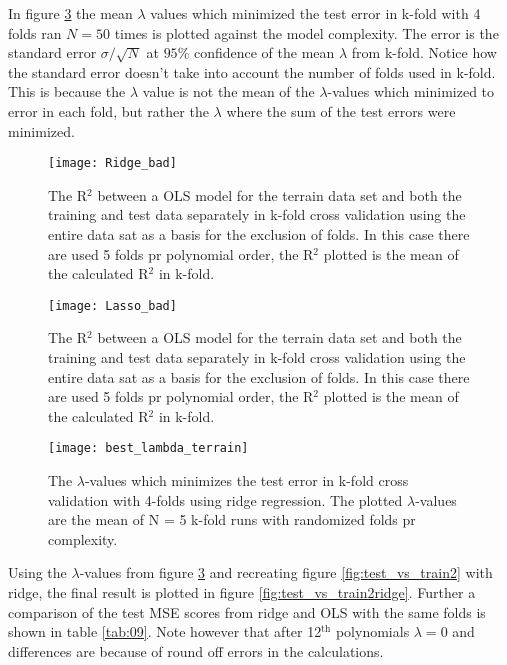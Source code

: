 \documentclass[uio,jmp,amsmath,amssymb,reprint,nofootinbib]{revtex4-1}
\numberwithin{equation}{section}
\begin{document}
In figure \ref{fig:lambda_pr_degree_terrain} the mean \(\lambda\) values which minimized the test error in k-fold with 4 folds ran \(N=50\) times is plotted against the model complexity. The error is the standard error \(\sigma/\sqrt{N}\) at \(95\%\) confidence of the mean \(\lambda\) from k-fold. Notice how the standard error doesn't take into account the number of folds used in k-fold. This is because the \(\lambda\) value is not the mean of the \(\lambda\)-values which minimized to error in each fold, but rather the \(\lambda\) where the sum of the test errors were minimized.


\begin{figure}[H]
    \centering
    \texttt{[image: Ridge\_bad]}
    \caption{The R\(^2\) between a OLS model for the terrain data set and both the training and test data separately in k-fold cross validation using the entire data sat as a basis for the exclusion of folds. In this case there are used 5 folds pr polynomial order, the R\(^2\) plotted is the mean of the calculated R\(^2\) in k-fold.}
    \label{fig:ridge_bad}
\end{figure}

\begin{figure}[H]
    \centering
    \texttt{[image: Lasso\_bad]}
    \caption{The R\(^2\) between a OLS model for the terrain data set and both the training and test data separately in k-fold cross validation using the entire data sat as a basis for the exclusion of folds. In this case there are used 5 folds pr polynomial order, the R\(^2\) plotted is the mean of the calculated R\(^2\) in k-fold.}
    \label{fig:lasso_bad}
\end{figure}

\begin{figure}[H]
    \centering
    \texttt{[image: best\_lambda\_terrain]}
    \caption{The \(\lambda\)-values which minimizes the test error in k-fold cross validation with 4-folds using ridge regression. The plotted \(\lambda\)-values are the mean of N = 5 k-fold runs with randomized folds pr complexity.}
    \label{fig:lambda_pr_degree_terrain}
\end{figure}

Using the \(\lambda\)-values from figure \ref{fig:lambda_pr_degree_terrain} and recreating figure \ref{fig:test_vs_train2} with ridge, the final result is plotted in figure \ref{fig:test_vs_train2ridge}. Further a comparison of the test MSE scores from ridge and OLS with the same folds is shown in table \ref{tab:09}. Note however that after 12\(^\text{th}\) polynomials \(\lambda = 0\) and differences are because of round off errors in the calculations.
\end{document}
